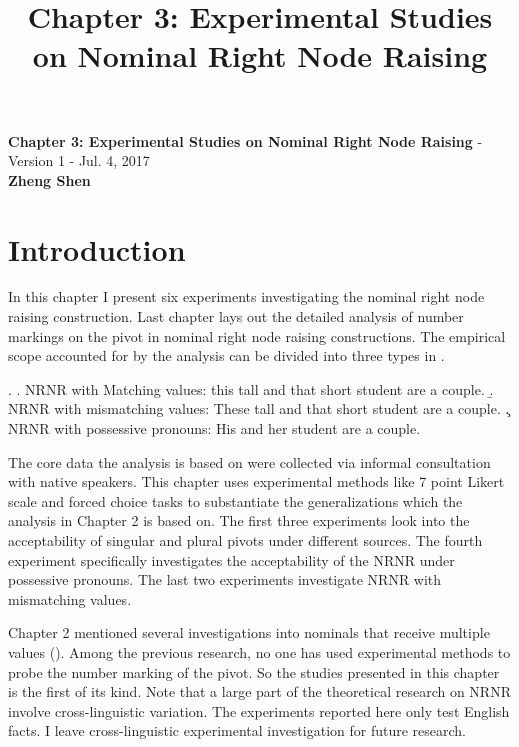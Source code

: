 \documentclass[
  11pt          %
  ,letterpaper  %
  ,center       %
  ,noupper      %
  ]{uconnthesis2}
\title{Chapter 3: Experimental Studies on Nominal Right Node Raising}
\begin{document}


\noindent \large{\textbf{Chapter 3: Experimental Studies on Nominal Right Node Raising}} - Version 1 - Jul. 4, 2017\\

\noindent \large{\textbf{Zheng Shen}}

\tableofcontents

\section{Introduction}

In this chapter I present six experiments investigating the nominal right node raising construction. Last chapter lays out the detailed analysis of number markings on the pivot in nominal right node raising constructions. The empirical scope accounted for by the analysis can be divided into three types in \Next. 

\ex. 
\a. NRNR with Matching values: this tall and that short student are a couple.
\b. NRNR with mismatching values: These tall and that short student are a couple.
\c. NRNR with possessive pronouns: His and her student are a couple.

The core data the analysis is based on were collected via informal consultation with native speakers. This chapter uses experimental methods like 7 point Likert scale and forced choice tasks to substantiate the generalizations which the analysis in Chapter 2 is based on. The first three experiments look into the acceptability of singular and plural pivots under different sources. The fourth experiment specifically investigates the acceptability of the NRNR under possessive pronouns. The last two experiments investigate NRNR with mismatching values. 


Chapter 2 mentioned several investigations into nominals that receive multiple values (\citealt{Harizanov:2014, Harizanov:2015, Belyaev:2015, Shen:2016, Shen:2017, Shen:ta}). Among the previous research, no one has used experimental methods to probe the number marking of the pivot. So the studies presented in this chapter is the first of its kind. Note that a large part of the theoretical research on NRNR involve cross-linguistic variation. The experiments reported here only test English facts. I leave cross-linguistic experimental investigation for future research.
\end{document}
